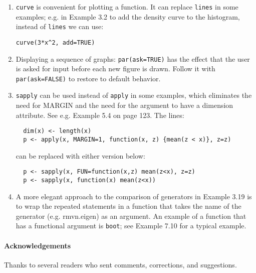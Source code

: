 \documentclass{article}
\begin{document}
\begin{enumerate}
 \item \texttt{curve} is convenient for plotting a function. It can replace \texttt{lines} in some examples; e.g. in Example 3.2 to add the density curve to the histogram, instead of \texttt{lines}
     we can use:

     \verb|curve(3*x^2, add=TRUE)|

 \item Displaying a sequence of graphs: \texttt{par(ask=TRUE)} has the effect that the user is asked for input before each new figure is drawn. Follow it with \texttt{par(ask=FALSE)} to restore to default behavior.

\item \texttt{sapply} can be used instead of \texttt{apply} in some examples, which eliminates the need for MARGIN and the need for
    the argument to have a dimension attribute.
    See e.g. Example 5.4 on page 123. The lines:

\begin{verbatim}
  dim(x) <- length(x)
  p <- apply(x, MARGIN=1, function(x, z) {mean(z < x)}, z=z)
\end{verbatim}
    can be replaced with either version below:
\begin{verbatim}
  p <- sapply(x, FUN=function(x,z) mean(z<x), z=z)
  p <- sapply(x, function(x) mean(z<x))
\end{verbatim}

\item A more elegant approach to the comparison of generators in Example 3.19
is to wrap the repeated statements in a function that takes the
name of the generator (e.g. rmvn.eigen) as an argument. An example
of a function that has a functional argument is \texttt{boot}; see
Example 7.10 for a typical example.

\end{enumerate}

\paragraph{Acknowledgements}

Thanks to several readers who sent comments, corrections, and suggestions.
\end{document}
